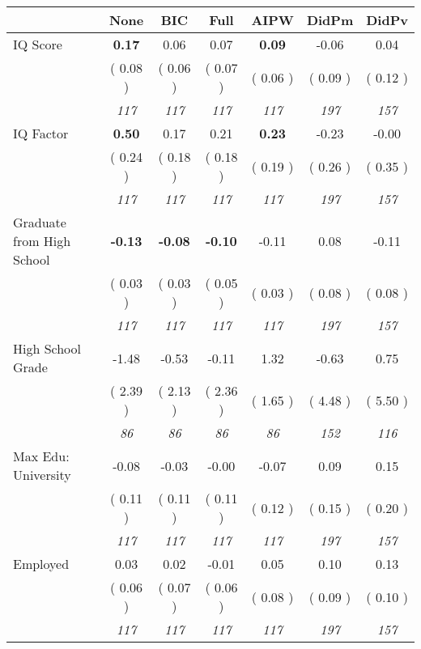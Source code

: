 \begin{tabular}{l c c c c c c}
\toprule
 & None & BIC & Full & AIPW & DidPm & DidPv \\
\midrule
IQ Score & \textbf{      0.17 } &      0.06 &      0.07 & \textbf{     0.09} &     -0.06 &      0.04 \\
& (     0.08 ) & (     0.06 ) & (     0.07 ) & (     0.06 ) & (     0.09 ) & (     0.12 ) \\
& \textit{ 117 } & \textit{ 117 } & \textit{ 117 } & \textit{ 117 } & \textit{ 197 } & \textit{ 157 } \\
IQ Factor & \textbf{      0.50 } &      0.17 &      0.21 & \textbf{     0.23} &     -0.23 &     -0.00 \\
& (     0.24 ) & (     0.18 ) & (     0.18 ) & (     0.19 ) & (     0.26 ) & (     0.35 ) \\
& \textit{ 117 } & \textit{ 117 } & \textit{ 117 } & \textit{ 117 } & \textit{ 197 } & \textit{ 157 } \\
Graduate from High School & \textbf{     -0.13 } & \textbf{     -0.08 } & \textbf{     -0.10 } &     -0.11 &      0.08 &     -0.11 \\
& (     0.03 ) & (     0.03 ) & (     0.05 ) & (     0.03 ) & (     0.08 ) & (     0.08 ) \\
& \textit{ 117 } & \textit{ 117 } & \textit{ 117 } & \textit{ 117 } & \textit{ 197 } & \textit{ 157 } \\
High School Grade &     -1.48 &     -0.53 &     -0.11 &      1.32 &     -0.63 &      0.75 \\
& (     2.39 ) & (     2.13 ) & (     2.36 ) & (     1.65 ) & (     4.48 ) & (     5.50 ) \\
& \textit{ 86 } & \textit{ 86 } & \textit{ 86 } & \textit{ 86 } & \textit{ 152 } & \textit{ 116 } \\
Max Edu: University &     -0.08 &     -0.03 &     -0.00 &     -0.07 &      0.09 &      0.15 \\
& (     0.11 ) & (     0.11 ) & (     0.11 ) & (     0.12 ) & (     0.15 ) & (     0.20 ) \\
& \textit{ 117 } & \textit{ 117 } & \textit{ 117 } & \textit{ 117 } & \textit{ 197 } & \textit{ 157 } \\
Employed &      0.03 &      0.02 &     -0.01 &      0.05 &      0.10 &      0.13 \\
& (     0.06 ) & (     0.07 ) & (     0.06 ) & (     0.08 ) & (     0.09 ) & (     0.10 ) \\
& \textit{ 117 } & \textit{ 117 } & \textit{ 117 } & \textit{ 117 } & \textit{ 197 } & \textit{ 157 } \\

\end{tabular}
